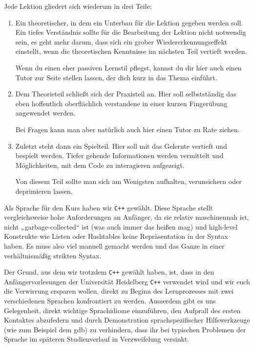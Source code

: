 \documentclass{vorkurs}
\newcommand{\swname}[1]{\texttt{#1}\xspace}
\newcommand{\Cpp}{\swname{C++}}
\begin{document}
Jede Lektion gliedert sich wiederum in drei Teile:
\begin{enumerate}
    \item Ein theoretischer, in dem ein Unterbau für die Lektion gegeben werden
        soll.  Ein tiefes Verständnis sollte für die Bearbeitung der Lektion
        nicht notwendig sein, es geht mehr darum, dass sich ein grober
        Wiedererkennungseffekt einstellt, wenn die theoretischen Kenntnisse im
        nächsten Teil vertieft werden.

        Wenn du einen eher passiven Lernstil pflegst, kannst du dir hier auch
        einen Tutor zur Seite stellen lassen, der dich kurz in das Thema
        einführt.
    \item Dem Theorieteil schließt sich der Praxisteil an.
        Hier soll selbstständig das eben hoffentlich oberflächlich verstandene
        in einer kurzen Fingerübung angewendet werden.

        Bei Fragen kann man aber natürlich auch hier einen Tutor zu Rate
        ziehen.
    \item Zuletzt steht dann ein Spielteil. Hier soll mit das Gelernte vertieft und bespielt werden.
        Tiefer gehende Informationen werden vermittelt und Möglichkeiten, mit
        dem Code zu interagieren aufgezeigt.

        Von diesem Teil sollte man sich am Wenigsten aufhalten, verunsichern
        oder deprimieren lassen.
\end{enumerate}

Als Sprache für den Kurs haben wir \Cpp gewählt.  Diese Sprache stellt
vergleichsweise hohe Anforderungen an Anfänger, da sie relativ maschinennah
ist, nicht „garbage-collected“ ist (was auch immer das heißen mag) und
high-level Konstrukte wie Listen oder Hashtables keine Repräsentation in der
Syntax haben.  Es muss also viel manuell gemacht werden und das Ganze in einer
verhältnismäßig strikten Syntax.

Der Grund, aus dem wir trotzdem \Cpp gewählt haben, ist, dass in den
Anfängervorlesungen der Universität Heidelberg \Cpp verwendet wird und wir euch
die Verwirrung ersparen wollen, direkt zu Beginn des Lernprozesses mit zwei
verschiedenen Sprachen konfrontiert zu werden.  Ausserdem gibt es uns
Gelegenheit, direkt wichtige Sprachidiome einzuführen, den Aufprall des ersten
Kontaktes abzufedern und durch Demonstration sprachspezifischer Hilfswerkzeuge
(wie zum Beispiel dem gdb) zu verhindern, dass ihr bei typischen Problemen der
Sprache im späteren Studienverlauf in Verzweifelung versinkt.
\end{document}

